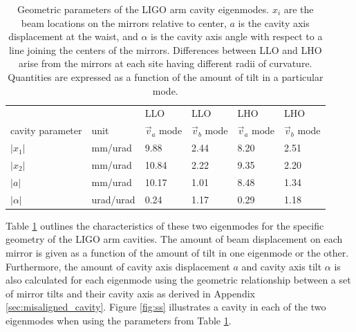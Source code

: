 \begin{table}
\centering
\caption[Geometric parameters of the LIGO arm cavity
  eigenmodes]{Geometric parameters of the LIGO arm cavity
  eigenmodes. $x_i$ are the beam locations on the mirrors relative
  to center, $a$ is the cavity axis displacement at the waist, and
  $\alpha$ is the cavity axis angle with respect to a line joining the
  centers of the mirrors. Differences between LLO and LHO arise from the
  mirrors at each site having different radii of curvature. Quantities
  are expressed as a function of the amount of tilt in a particular mode.}
\begin{tabular}{l l l l l l}
& & LLO & LLO & LHO & LHO \\
cavity parameter & unit & $\vec{v}_a$ mode & $\vec{v}_b$ mode & $\vec{v}_a$ mode & $\vec{v}_b$ mode \\
\hline\hline
$|x_1|$ & mm/urad & 9.88 & 2.44 & 8.20 & 2.51\\
$|x_2|$ & mm/urad & 10.84 & 2.22 & 9.35 & 2.20\\
$|a|$ & mm/urad & 10.17 & 1.01 & 8.48 & 1.34 \\
$|\alpha|$ & urad/urad & 0.24 & 1.17 & 0.29 & 1.18 \\
\hline
\end{tabular}
\label{table:cav_geometric}
\end{table}


Table \ref{table:cav_geometric} outlines the characteristics of these
two eigenmodes for the specific geometry of the LIGO arm cavities. The
amount of beam displacement on each mirror is given as a function of
the amount of tilt in one eigenmode or the other. Furthermore, the
amount of cavity axis displacement $a$ and cavity axis tilt $\alpha$
is also calculated for each eigenmode using the geometric relationship
between a set of mirror tilts and their cavity axis as derived in
Appendix \ref{sec:misaligned_cavity}. Figure \ref{fig:ss} illustrates
a cavity in each of the two eigenmodes when using the parameters from
Table \ref{table:cav_geometric}.



